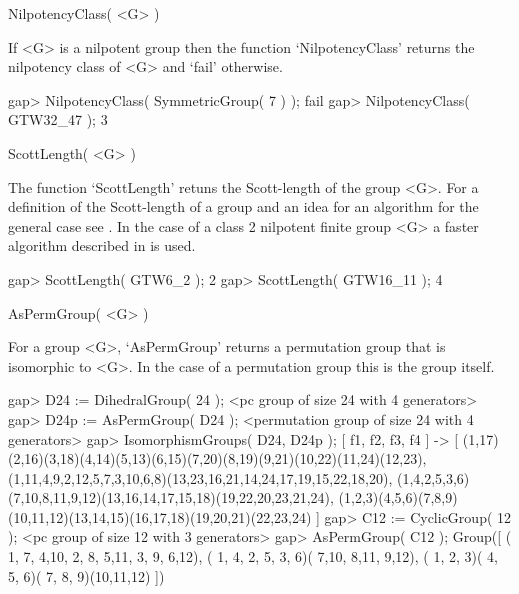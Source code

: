 

\>NilpotencyClass( <G> )

If <G> is a nilpotent group then the function `NilpotencyClass' returns the 
nilpotency class of <G> and `fail' otherwise.

\beginexample
    gap> NilpotencyClass( SymmetricGroup( 7 ) );
    fail
    gap> NilpotencyClass( GTW32_47 );
    3
\endexample



\>ScottLength( <G> )

The function `ScottLength' retuns the Scott-length of the group <G>.
For a definition of the Scott-length of a group and an idea for an
algorithm for the general case see \cite{scott69:TAOPMOAGATSOCPPGI}.
In the case of a class 2 nilpotent finite group <G> a faster algorithm
described in \cite{ecker98:OTNOPFONGOC2} is used.

\beginexample
    gap> ScottLength( GTW6_2 );    
    2
    gap> ScottLength( GTW16_11 );
    4
\endexample



\>AsPermGroup( <G> )

For a group <G>, `AsPermGroup' returns a permutation group that is isomorphic
to <G>. In the case of a permutation group this is the group itself.

\beginexample
    gap> D24 := DihedralGroup( 24 );
    <pc group of size 24 with 4 generators>
    gap> D24p := AsPermGroup( D24 );
    <permutation group of size 24 with 4 generators>
    gap> IsomorphismGroups( D24, D24p );
    [ f1, f2, f3, f4 ] ->
    [ (1,17)(2,16)(3,18)(4,14)(5,13)(6,15)(7,20)(8,19)(9,21)(10,22)(11,24)(12,23),
      (1,11,4,9,2,12,5,7,3,10,6,8)(13,23,16,21,14,24,17,19,15,22,18,20),
      (1,4,2,5,3,6)(7,10,8,11,9,12)(13,16,14,17,15,18)(19,22,20,23,21,24),
      (1,2,3)(4,5,6)(7,8,9)(10,11,12)(13,14,15)(16,17,18)(19,20,21)(22,23,24) ]
    gap> C12 := CyclicGroup( 12 );  
    <pc group of size 12 with 3 generators>
    gap> AsPermGroup( C12 );
    Group([ ( 1, 7, 4,10, 2, 8, 5,11, 3, 9, 6,12), 
      ( 1, 4, 2, 5, 3, 6)( 7,10, 8,11, 9,12), 
      ( 1, 2, 3)( 4, 5, 6)( 7, 8, 9)(10,11,12) ])
\endexample




















